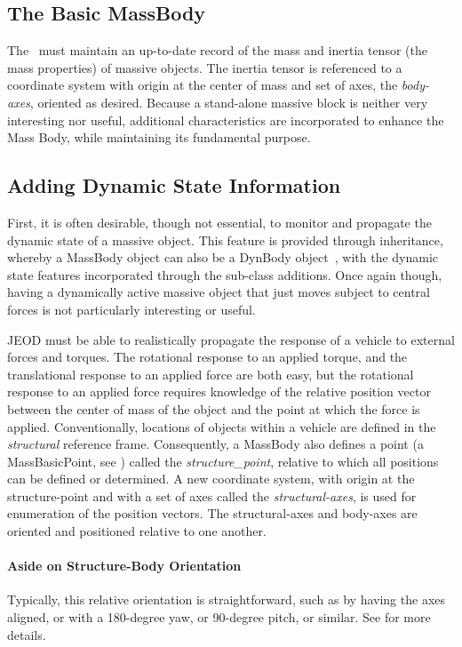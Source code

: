 \subsection{The Basic MassBody}
The \ModelDesc\ must maintain an up-to-date record of the mass and inertia 
tensor (the mass properties) of massive objects.  The inertia tensor 
is referenced to a coordinate system with origin at 
the center of mass and set of axes, the \textit{body-axes}, oriented as 
desired.
Because a stand-alone massive block
is neither very interesting nor useful, additional characteristics are 
incorporated to enhance the Mass Body, while maintaining its fundamental
purpose.

\subsection{Adding Dynamic State Information}
First, it is often desirable, though not essential, to monitor and propagate 
the
dynamic state of a massive object.  This feature is provided through
inheritance,
whereby a MassBody object can also be a DynBody object~\cite{dynenv:DYNBODY},
with the dynamic state features incorporated through the sub-class additions.
Once again though, having a dynamically active massive object that just moves 
subject to central forces is not particularly interesting or useful.

JEOD must be able to realistically propagate the response of a vehicle to 
external forces and torques. The rotational response to an applied torque, and 
the translational response to an applied force are both easy, but the 
rotational response to an applied force requires knowledge of the relative 
position vector between the center of mass of the object and the point at 
which 
the force is applied.  Conventionally, locations of objects within a vehicle 
are defined in the \textit{structural} reference frame.  Consequently, a 
MassBody also defines a point
(a MassBasicPoint, see ) called the 
\textit{structure\_point}, relative to which all 
positions can be defined or determined.  A new coordinate system, with origin 
at the structure-point and with a set of axes called the 
\textit{structural-axes}, is used 
for enumeration of the position vectors.  The structural-axes and body-axes 
are oriented and positioned relative to one another.

\paragraph {Aside on Structure-Body Orientation}
Typically, this relative orientation is straightforward, such as by 
having the axes aligned, or with a 180-degree yaw, or 90-degree pitch, or 
similar. See  for 
more details.

